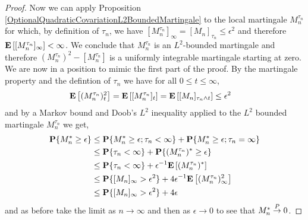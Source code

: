 \begin{proof}
Now we can apply Proposition \ref{OptionalQuadraticCovariationL2BoundedMartingale} to the local martingale $M^{\tau_n}_n$ for which, by definition of $\tau_n$, we have $[M^{\tau_n}_n]_\infty = [M_n]_{\tau_n} \leq \epsilon^2$ and therefore $\textbf{E}\left[[M^{\tau_n}_n]_\infty\right] < \infty$.  We conclude that $M^{\tau_n}_n$ is an $L^2$-bounded martingale and therefore $(M^{\tau_n}_n)^2 - [M^{\tau_n}_n]$ is a uniformly integrable martingale starting at zero.  We are now in a position to mimic the first part of the proof.   By the martingale property and the defintion of $\tau_n$ we have for all $0 \leq t \leq \infty$,
\begin{align*}
\textbf{E}\left[(M^{\tau_n}_n)_t^2\right] &= \textbf{E}\left[ [M^{\tau_n}_n]_t \right] = \textbf{E}\left[ [M_n]_{\tau_n \wedge t} \right] \leq \epsilon^2
\end{align*}
and by a Markov bound and Doob's $L^2$ inequality applied to the $L^2$ bounded martingale $M^{\tau_n}_n$ we get,
\begin{align*}
\textbf{P}\{M^*_n \geq \epsilon\} &\leq \textbf{P}\{M^*_n \geq \epsilon; \tau_n < \infty \}  + \textbf{P}\{M^*_n \geq \epsilon ; \tau_n = \infty\} \\
&\leq \textbf{P}\{\tau_n < \infty \}  + \textbf{P}\{(M^{\tau_n}_n)^* \geq \epsilon\} \\
&\leq \textbf{P}\{\tau_n < \infty \}  + \epsilon^{-1} \textbf{E}\left[(M^{\tau_n}_n)^*\right] \\
&\leq \textbf{P}\{[M_n]_\infty > \epsilon^2 \}  + 4 \epsilon^{-1} \textbf{E}\left[(M^{\tau_n}_n)^2_\infty\right] \\
&\leq \textbf{P}\{[M_n]_\infty > \epsilon^2 \}  + 4 \epsilon \\
\end{align*}
and as before take the limit as $n \to \infty$ and then as $\epsilon \to 0$ to see that $M^*_n \overset{P}\to 0$.
\end{proof}

